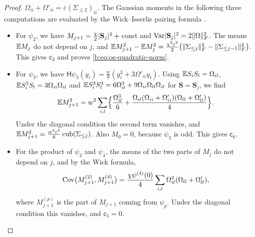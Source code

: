\begin{proof}
$\Omega_{ii}+\Omega'_{ii}=\varepsilon(\Sigma_{\le2})_{ii}$.
The Gaussian moments in the following three computations are evaluated by
the Wick--Isserlis pairing formula \cite{isserlis-1918}.
\begin{itemize}
\item For $\psi_2$, we have $M_{j+1}=\frac\chi2\lvert \mathbf S_j\rvert^2+{}$const and
 $\operatorname{Var}\lvert \mathbf S_j\rvert^2=2\lVert \Omega\rVert_F^2$. The means $\mathbb E M_j$ do not depend on
 $j$, and $\mathbb E M_{j+1}^2-\mathbb E M_j^2=\frac{\chi^2\varepsilon^2}2\bigl(\lVert \Sigma_{\le
 j}\rVert_F^2-\lVert \Sigma_{\le j-1}\rVert_F^2\bigr)$. This gives $\mathsf c_3$ and proves
 \eqref{b:eq:os-quadratic-norm}.
\item For $\psi_3$, we have $\mathsf H\psi_3(y_i)=\frac w6(y_i^3+3\Omega'_{ii}y_i)$.
 Using $\mathbb E S_iS_l=\Omega_{il}$, $\mathbb E S_i^3S_l=3\Omega_{ii}\Omega_{il}$ and
 $\mathbb E S_i^3S_l^3=6\Omega_{il}^3+9\Omega_{ii}\Omega_{ll}\Omega_{il}$ for $\mathbf S=\mathbf S_j$, we
 find
 \begin{equation}\label{eq:cub-wick}
  \mathbb E M_{j+1}^2=w^2\sum_{i,l}\Bigl\{\frac{\Omega_{il}^3}6
  +\frac{\Omega_{il}(\Omega_{ii}+\Omega'_{ii})(\Omega_{ll}+\Omega'_{ll})}4\Bigr\}.
 \end{equation}
 Under the diagonal condition the second term vanishes, and
 $\mathbb E M_{j+1}^2=\frac{w^2\varepsilon^3}6\operatorname{cub}(\Sigma_{\le j})$. Also
 $M_0=0$, because $\psi_3$ is odd. This gives $\mathsf c_6$.
\item For the product of $\psi_2$ and $\psi_4$, the means of the two parts of
 $M_j$ do not depend on $j$, and by the Wick formula,
 \[
  \operatorname{Cov}\bigl(M^{(2)}_{j+1},M^{(4)}_{j+1}\bigr)
  =\frac{\chi\psi^{(4)}(0)}4\sum_{i,l}\Omega_{il}^2(\Omega_{ll}+\Omega'_{ll}),
 \]
 where $M^{(p)}_{j+1}$ is the part of $M_{j+1}$ coming from $\psi_p$. Under
 the diagonal condition this vanishes, and $\mathsf c_5=0$.
\end{itemize}


\end{proof}

